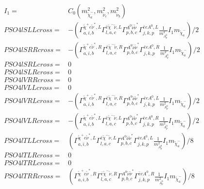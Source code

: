 \documentclass[A4,landscape]{article}
\begin{document}
\begin{align} 
I_1= & C_0(m^2_{\tilde{\chi}^-_{{a}}}, m^2_{\tilde{\nu}_{{c}}}, m^2_{\tilde{\nu}_{{b}}}) \\ 
  PSO4lSLLcross= & -( \Gamma^{\tilde{\chi}^+e \tilde{\nu}^*,L}_{a, i, b} \Gamma^{\bar{e}\tilde{\chi}^- \tilde{\nu} ,L}_{l, a, c} \Gamma^{A^0 \tilde{\nu} \tilde{\nu}^*}_{p, b, c} \Gamma^{\bar{e}e A^0 ,L}_{j, k, p} \frac{1}{m^2_{A^0_{{p}}}} I_1 m_{\tilde{\chi}^-_{{a}}})/2 \\ 
  PSO4lSRRcross= & -( \Gamma^{\tilde{\chi}^+e \tilde{\nu}^*,R}_{a, i, b} \Gamma^{\bar{e}\tilde{\chi}^- \tilde{\nu} ,R}_{l, a, c} \Gamma^{A^0 \tilde{\nu} \tilde{\nu}^*}_{p, b, c} \Gamma^{\bar{e}e A^0 ,R}_{j, k, p} \frac{1}{m^2_{A^0_{{p}}}} I_1 m_{\tilde{\chi}^-_{{a}}})/2 \\ 
  PSO4lSRLcross= & 0 \\ 
  PSO4lSLRcross= & 0 \\ 
  PSO4lVRRcross= & 0 \\ 
  PSO4lVLLcross= & 0 \\ 
  PSO4lVRLcross= & -( \Gamma^{\tilde{\chi}^+e \tilde{\nu}^*,R}_{a, i, b} \Gamma^{\bar{e}\tilde{\chi}^- \tilde{\nu} ,R}_{l, a, c} \Gamma^{A^0 \tilde{\nu} \tilde{\nu}^*}_{p, b, c} \Gamma^{\bar{e}e A^0 ,L}_{j, k, p} \frac{1}{m^2_{A^0_{{p}}}} I_1 m_{\tilde{\chi}^-_{{a}}})/2 \\ 
  PSO4lVLRcross= & -( \Gamma^{\tilde{\chi}^+e \tilde{\nu}^*,L}_{a, i, b} \Gamma^{\bar{e}\tilde{\chi}^- \tilde{\nu} ,L}_{l, a, c} \Gamma^{A^0 \tilde{\nu} \tilde{\nu}^*}_{p, b, c} \Gamma^{\bar{e}e A^0 ,R}_{j, k, p} \frac{1}{m^2_{A^0_{{p}}}} I_1 m_{\tilde{\chi}^-_{{a}}})/2 \\ 
  PSO4lTLLcross= & ( \Gamma^{\tilde{\chi}^+e \tilde{\nu}^*,L}_{a, i, b} \Gamma^{\bar{e}\tilde{\chi}^- \tilde{\nu} ,L}_{l, a, c} \Gamma^{A^0 \tilde{\nu} \tilde{\nu}^*}_{p, b, c} \Gamma^{\bar{e}e A^0 ,L}_{j, k, p} \frac{1}{m^2_{A^0_{{p}}}} I_1 m_{\tilde{\chi}^-_{{a}}})/8 \\ 
  PSO4lTLRcross= & 0 \\ 
  PSO4lTRLcross= & 0 \\ 
  PSO4lTRRcross= & ( \Gamma^{\tilde{\chi}^+e \tilde{\nu}^*,R}_{a, i, b} \Gamma^{\bar{e}\tilde{\chi}^- \tilde{\nu} ,R}_{l, a, c} \Gamma^{A^0 \tilde{\nu} \tilde{\nu}^*}_{p, b, c} \Gamma^{\bar{e}e A^0 ,R}_{j, k, p} \frac{1}{m^2_{A^0_{{p}}}} I_1 m_{\tilde{\chi}^-_{{a}}})/8 \\ 
\end{align} 
\end{document}
